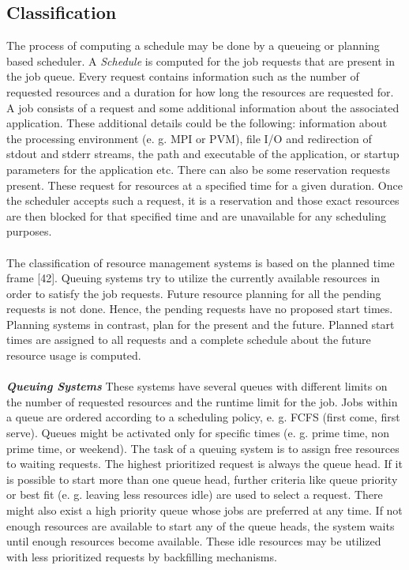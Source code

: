 \subsection{Classification}
The process of computing a schedule may be done by a queueing or planning based scheduler. A \textit{Schedule} is computed for the job requests that are present in the job queue. Every request contains information such as the number of requested resources and a duration for how long the resources are requested for. A job consists of a request and some additional information about the associated application. These additional details could be the following: information about the processing environment (e. g. MPI or PVM), file I/O and redirection of stdout and stderr streams, the path and executable of the application, or startup parameters for the application etc. There can also be some reservation requests present. These request for resources at a specified time for a given duration. Once the scheduler accepts such a request, it is a reservation and those exact resources are then blocked for that specified time and are unavailable for any scheduling purposes.\\ \\
The classification of resource management systems is based on the planned time frame [42]. Queuing systems try to utilize the currently available resources in order to satisfy the job requests. Future resource planning for all the pending requests is not done. Hence, the pending requests have no proposed start times. Planning systems in contrast, plan for the present and the future. Planned start times are assigned to all requests and a complete schedule about the future resource usage is computed.\\ \\
\textbf{\textit{Queuing Systems }} These systems have several queues with different limits on the number of requested resources and the runtime limit for the job. Jobs within a queue are ordered according to a scheduling policy, e. g. FCFS (first come, first serve). Queues might be activated only for specific times (e. g. prime time, non prime time, or weekend). The task of a queuing system is to assign free resources to waiting requests. The highest prioritized request is always the queue head. If it is possible to start more than one queue head, further criteria like queue priority or best fit (e. g. leaving less resources idle) are used to select a request. There might also exist a high priority queue whose jobs are preferred at any time. If not enough resources are available to start any of the queue heads, the system waits until enough resources become available. These idle resources may be utilized with less prioritized requests by backfilling mechanisms.\\ \\
